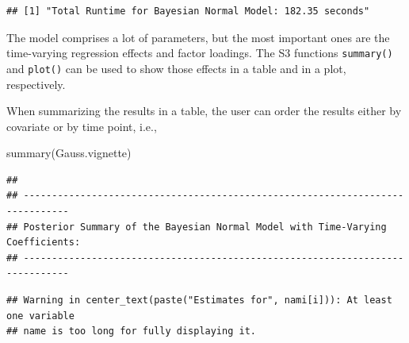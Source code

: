 \documentclass[a4paper, preprint, 3p,
authoryear]{elsarticle} %
\newenvironment{Shaded}{\begin{snugshade}}{\end{snugshade}}
\newcommand{\NormalTok}[1]{#1}
\begin{document}
\begin{verbatim}
## [1] "Total Runtime for Bayesian Normal Model: 182.35 seconds"
\end{verbatim}

The model comprises a lot of parameters, but the most important ones are
the time-varying regression effects and factor loadings. The S3
functions \texttt{summary()} and \texttt{plot()} can be used to show
those effects in a table and in a plot, respectively.

When summarizing the results in a table, the user can order the results
either by covariate or by time point, i.e.,

\begin{Shaded}
\begin{Highlighting}[]
\NormalTok{summary(Gauss.vignette)}
\end{Highlighting}
\end{Shaded}

\begin{verbatim}
## 
## ------------------------------------------------------------------------------
## Posterior Summary of the Bayesian Normal Model with Time-Varying Coefficients:
## ------------------------------------------------------------------------------
\end{verbatim}

\begin{verbatim}
## Warning in center_text(paste("Estimates for", nami[i])): At least one variable
## name is too long for fully displaying it.
\end{verbatim}
\end{document}
